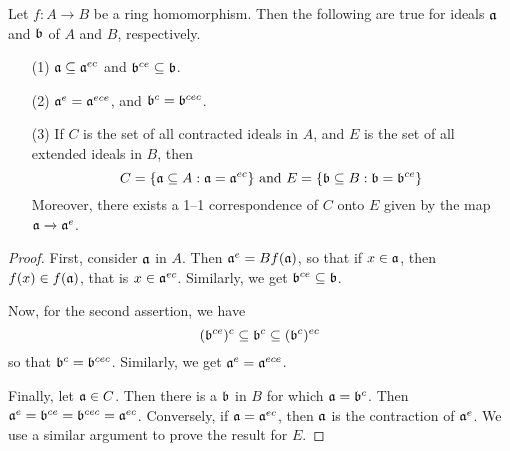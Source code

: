 \begin{lemma}\label{1.10.4}
    Let $f:A \xrightarrow{} B$ be a ring homomorphism. Then the following are
    true for ideals $\af$ and  $\bf$ of  $A$ and  $B$, respectively.
    \begin{enumerate}
        \item[(1)] $\af \subseteq \af^{ec}$ and $\bf^{ce} \subseteq \bf$.

        \item[(2)] $\af^e=\af^{ece}$, and $\bf^c=\bf^{cec}$.

        \item[(3)] If $C$ is the set of all contracted ideals in $A$, and  $E$
            is the set of all extended ideals in  $B$, then
            \begin{equation*}
                C=\{\af \subseteq A : \af=\af^{ec}\} \text{ and }
                E=\{\bf \subseteq B : \bf=\bf^{ce}\}
            \end{equation*}
            Moreover, there exists a 1--1 correspondence of $C$ onto $E$  given
            by the map $\af \xrightarrow{} \af^e$.
    \end{enumerate}
\end{lemma}
\begin{proof}
    First, consider $\af$ in  $A$. Then  $\af^e=Bf(\af)$, so that if $x \in
    \af$, then  $f(x) \in f(\af)$, that is $x \in \af^{ec}$. Similarly, we
    get $\bf^{ce} \subseteq \bf$.

    Now, for the second assertion, we have
    \begin{equation*}
        (\bf^{ce})^c \subseteq \bf^c \subseteq (\bf^c)^{ec}
    \end{equation*}
    so that $\bf^c=\bf^{cec}$. Similarly, we get $\af^e=\af^{ece}$.

    Finally, let $\af \in C$. Then there is a $\bf$ in $B$ for which
    $\af=\bf^c$. Then  $\af^e=\bf^{ce}=\bf^{cec}=\af^{ec}$. Conversely, if
    $\af=\af^{ec}$, then $\af$ is the contraction of $\af^e$. We use a similar
    argument to prove the result for $E$.
\end{proof}

